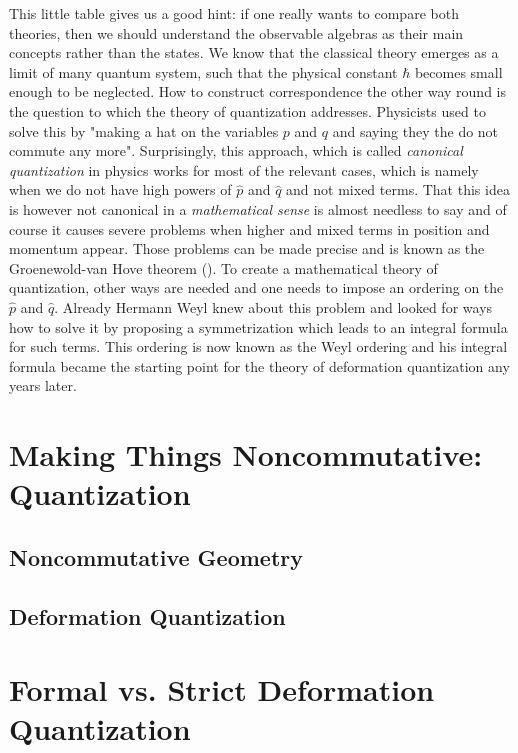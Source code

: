 This little table gives us a good hint: if one really wants to compare both theories, then we should understand the observable algebras as their main concepts rather than the states. We know that the classical theory emerges as a limit of many quantum system, such that the physical constant $\hbar$ becomes small enough to be neglected. How to construct correspondence the other way round is the question to which the theory of quantization addresses. Physicists used to solve this by "making a hat on the variables $p$ and $q$ and saying they the do not commute any more". Surprisingly, this approach, which is called \emph{canonical quantization} in physics works for most of the relevant cases, which is namely when we do not have high powers of $\hat p$ and $\hat q$ and not mixed terms. That this idea is however not canonical in a \emph{mathematical sense} is almost needless to say and of course it causes severe problems when higher and mixed terms in position and momentum appear. Those problems can be made precise and is known as the Groenewold-van Hove theorem (\cite{vanhove:1951a, groenewold:1946a}). To create a mathematical theory of quantization, other ways are needed and one needs to impose an ordering on the $\hat p$ and $\hat q$. Already Hermann Weyl knew about this problem and looked for ways how to solve it by proposing a symmetrization \cite{weyl:1931a} which leads to an integral formula for such terms. This ordering is now known as the Weyl ordering and his integral formula became the starting point for the theory of deformation quantization any years later.



\section{Making Things Noncommutative: Quantization}
\label{sec:chap2_Quantization}

\subsection{Noncommutative Geometry}
\label{subsec:chap2_NoncommGeometry}

\subsection{Deformation Quantization}
\label{subsec:chap2_Deformation}



\section{Formal vs. Strict Deformation Quantization}
\label{sec:chap2_FormalStrict}

